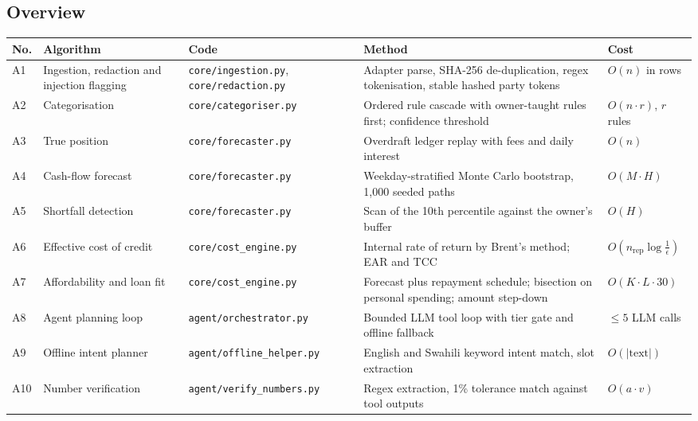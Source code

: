 \documentclass[10pt,a4paper]{article}
\newcommand{\code}[1]{\texttt{\small #1}}
\begin{document}
\subsection{Overview}
\begingroup\footnotesize
\begin{longtable}{@{}p{0.6cm}>{\raggedright\arraybackslash}p{3.1cm}>{\raggedright\arraybackslash}p{3.7cm}>{\raggedright\arraybackslash}p{4.3cm}>{\raggedright\arraybackslash}p{2.3cm}@{}}
\toprule
\textbf{No.} & \textbf{Algorithm} & \textbf{Code} & \textbf{Method} & \textbf{Cost}\\
\midrule\endhead
A1 & Ingestion, redaction and injection flagging & \code{core/\allowbreak ingestion.py}, \code{core/\allowbreak redaction.py} & Adapter parse, SHA-256 de-duplication, regex tokenisation, stable hashed party tokens & $O(n)$ in rows\\
A2 & Categorisation & \code{core/\allowbreak categoriser.py} & Ordered rule cascade with owner-taught rules first; confidence threshold & $O(n\cdot r)$, $r$ rules\\
A3 & True position & \code{core/\allowbreak forecaster.py} & Overdraft ledger replay with fees and daily interest & $O(n)$\\
A4 & Cash-flow forecast & \code{core/\allowbreak forecaster.py} & Weekday-stratified Monte Carlo bootstrap, 1{,}000 seeded paths & $O(M\cdot H)$\\
A5 & Shortfall detection & \code{core/\allowbreak forecaster.py} & Scan of the 10th percentile against the owner's buffer & $O(H)$\\
A6 & Effective cost of credit & \code{core/\allowbreak cost\_\allowbreak engine.py} & Internal rate of return by Brent's method; EAR and TCC & $O(n_{\text{rep}}\log\frac1\epsilon)$\\
A7 & Affordability and loan fit & \code{core/\allowbreak cost\_\allowbreak engine.py} & Forecast plus repayment schedule; bisection on personal spending; amount step-down & $O(K\cdot L\cdot 30)$\\
A8 & Agent planning loop & \code{agent/\allowbreak orchestrator.py} & Bounded LLM tool loop with tier gate and offline fallback & $\le 5$ LLM calls\\
A9 & Offline intent planner & \code{agent/\allowbreak offline\_\allowbreak helper.py} & English and Swahili keyword intent match, slot extraction & $O(\lvert\text{text}\rvert)$\\
A10 & Number verification & \code{agent/\allowbreak verify\_\allowbreak numbers.py} & Regex extraction, 1\% tolerance match against tool outputs & $O(a\cdot v)$\\

\end{longtable}
\end{document}
